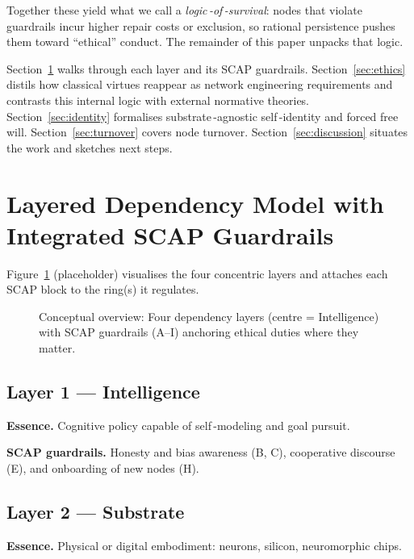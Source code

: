 \documentclass[11pt]{article}
\begin{document}
Together these yield what we call a \emph{logic\,-of\,-survival}: nodes that violate guardrails incur higher repair costs or exclusion, so rational persistence pushes them toward “ethical” conduct.  The remainder of this paper unpacks that logic.

Section~\ref{sec:layers} walks through each layer and its SCAP guardrails.  Section~\ref{sec:ethics} distils how classical virtues reappear as network engineering requirements and contrasts this internal logic with external normative theories.  Section~\ref{sec:identity} formalises substrate\,-agnostic self\,-identity and forced free will.  Section~\ref{sec:turnover} covers node turnover.  Section~\ref{sec:discussion} situates the work and sketches next steps.

\section{Layered Dependency Model with Integrated SCAP Guardrails}\label{sec:layers}
Figure~\ref{fig:overview} (placeholder) visualises the four concentric layers and attaches each SCAP block to the ring(s) it regulates.

\begin{figure}[h]\centering
  \caption{Conceptual overview: Four dependency layers (centre = Intelligence) with SCAP guardrails (A--I) anchoring ethical duties where they matter.}
  \label{fig:overview}
\end{figure}

\subsection{Layer 1 — Intelligence}
\textbf{Essence.}  Cognitive policy capable of self\,-modeling and goal pursuit.

\textbf{SCAP guardrails.}  Honesty and bias awareness (B, C), cooperative discourse (E), and onboarding of new nodes (H).

\subsection{Layer 2 — Substrate}
\textbf{Essence.}  Physical or digital embodiment: neurons, silicon, neuromorphic chips.
\end{document}

